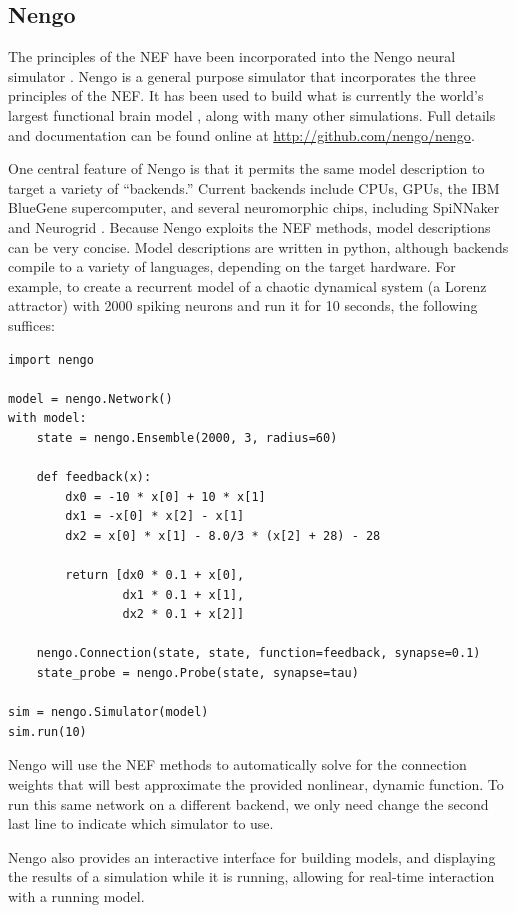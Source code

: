 \documentclass[english]{article}
\begin{document}
\subsection{Nengo}

The principles of the NEF have been incorporated into the Nengo neural simulator \cite{Bekolay2014}.  Nengo is a general purpose simulator that incorporates the three principles of the NEF.  It has been used to build what is currently the world's largest functional brain model \cite{Eliasmith2012b}, along with many other simulations. Full details and documentation can be found online at \url{http://github.com/nengo/nengo}.

One central feature of Nengo is that it permits the same model description to target a variety of ``backends.''  Current backends include CPUs, GPUs, the IBM BlueGene supercomputer, and several neuromorphic chips, including SpiNNaker \cite{Khan2008} and Neurogrid \cite{Choudhary2012}.  Because Nengo exploits the NEF methods, model descriptions can be very concise.  Model descriptions are written in python, although backends compile to a variety of languages, depending on the target hardware. For example, to create a recurrent model of a chaotic dynamical system (a Lorenz attractor) with 2000 spiking neurons and run it for 10 seconds, the following suffices:

\begin{verbatim}
import nengo

model = nengo.Network()
with model:
    state = nengo.Ensemble(2000, 3, radius=60)
	
	def feedback(x):
	    dx0 = -10 * x[0] + 10 * x[1]
	    dx1 = -x[0] * x[2] - x[1]
	    dx2 = x[0] * x[1] - 8.0/3 * (x[2] + 28) - 28
	
	    return [dx0 * 0.1 + x[0],
	            dx1 * 0.1 + x[1],
	            dx2 * 0.1 + x[2]]
	                
    nengo.Connection(state, state, function=feedback, synapse=0.1)
    state_probe = nengo.Probe(state, synapse=tau)
    
sim = nengo.Simulator(model)
sim.run(10)
\end{verbatim}

Nengo will use the NEF methods to automatically solve for the connection weights that will
best approximate the provided nonlinear, dynamic function.  To run this same network on a different backend, we only need change the second last line to indicate which simulator to use.

Nengo also provides an interactive interface for building models, and displaying the results of a simulation while it is running, allowing for real-time interaction
with a running model.
\end{document}
